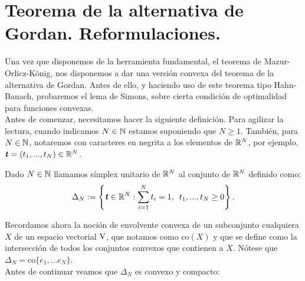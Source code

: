 \section{Teorema de la alternativa de Gordan. Reformulaciones.}
\newcommand{\ttt}{\textbf{\emph{t}}}
\newcommand{\sss}{\textbf{\emph{s}}}
\newcommand{\xx}{\textbf{\emph{x}}}
\newcommand{\yy}{\textbf{\emph{y}}}
\newcommand{\vv}{\textbf{\emph{v}}}
\newcommand{\ww}{\textbf{\emph{w}}}
\newcommand{\zz}{\textbf{\emph{z}}}

Una vez que disponemos de la herramienta fundamental, el teorema de Mazur-Orlicz-König, nos disponemos a dar una versión convexa del teorema de la alternativa de Gordan. Antes de ello, y haciendo uso de este teorema tipo Hahn-Banach, probaremos el lema de Simons, sobre cierta condición de optimalidad para funciones convexas. \\

Antes de comenzar, necesitamos hacer la siguiente definición. Para agilizar la lectura, cuando indicamos $ N\in \mathbb{N} $ estamos suponiendo que $ N \geq 1 $. También, para $ N \in \mathbb{N} $, notaremos con caracteres en negrita a los elementos de $ \mathbb{R}^N $, por ejemplo, $  \ttt = (t_1,...,t_N)\in \RR^N$. 

\begin{definicion}
	Dado $ N \in \mathbb{N} $ llamamos símplex unitario de $ \mathbb{R}^N $ al conjunto de $ \mathbb{R}^N $ definido como:
	\begin{equation*}
	\Delta_N := \left\lbrace \ttt \in \RR^N: \sum_{i=1}^{N}{t_i} = 1, \hspace{0.5em} t_1,...,t_N \geq 0 \right\rbrace .
	\end{equation*}
\end{definicion}

Recordamos ahora la noción de envolvente convexa de un subconjunto cualquiera $ X $ de un espacio vectorial $ \vecSpace $, que notamos como $ \mathrm{co}(X) $ y que se define como la intersección de todos los conjuntos convexos que contienen a $ X $. Nótese que $ \Delta_N = \mathrm{co}\{e_1,...e_N\} $. \\

Antes de continuar veamos que $ \Delta_N $ es convexo y compacto:

